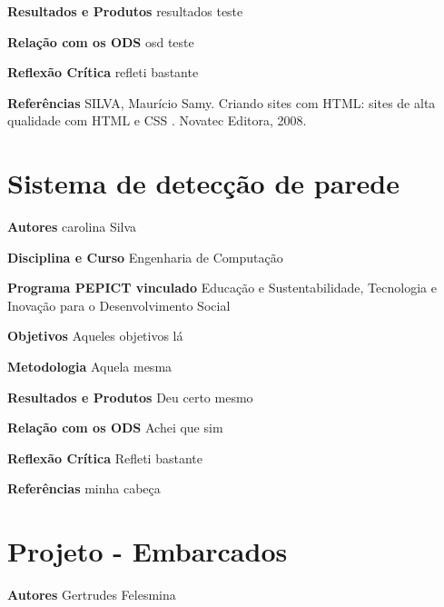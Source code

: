 \documentclass[12pt,openright,oneside,a4paper]{report}
\begin{document}
\vspace{0.7cm}
\noindent
\textbf{Resultados e Produtos}
resultados teste

\vspace{0.7cm}
\noindent
\textbf{Relação com os ODS}
osd teste

\vspace{0.7cm}
\noindent
\textbf{Reflexão Crítica}
refleti bastante

\vspace{0.7cm}
\noindent
\textbf{Referências}
SILVA, Maurício Samy. Criando sites com HTML: sites de alta qualidade com HTML e CSS . Novatec Editora, 2008.

\vspace{0.7cm}
\section{Sistema de detecção de parede}
\noindent
\textbf{Autores}
carolina Silva

\vspace{0.7cm}
\noindent
\textbf{Disciplina e Curso}
Engenharia de Computação

\vspace{0.7cm}
\noindent
\textbf{Programa PEPICT vinculado}
Educação e Sustentabilidade, Tecnologia e Inovação para o Desenvolvimento Social

\vspace{0.7cm}
\noindent
\textbf{Objetivos}
Aqueles objetivos lá

\vspace{0.7cm}
\noindent
\textbf{Metodologia}
Aquela mesma

\vspace{0.7cm}
\noindent
\textbf{Resultados e Produtos}
Deu certo mesmo

\vspace{0.7cm}
\noindent
\textbf{Relação com os ODS}
Achei que sim

\vspace{0.7cm}
\noindent
\textbf{Reflexão Crítica}
Refleti bastante

\vspace{0.7cm}
\noindent
\textbf{Referências}
minha cabeça

\vspace{0.7cm}
\section{Projeto - Embarcados}
\noindent
\textbf{Autores}
Gertrudes Felesmina
\end{document}
